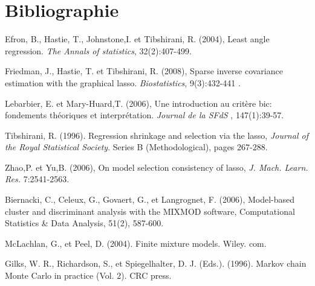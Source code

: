 \documentclass[12pt]{article}
\begin{document}
\section*{Bibliographie}
%

\noindent [1] Efron, B., Hastie, T., Johnstone,I. et Tibshirani, R. (2004), Least angle regression. {\it The
Annals of statistics}, 32(2):407-499.

\noindent [2] Friedman, J., Hastie, T. et Tibshirani, R. (2008), Sparse inverse covariance estimation with
the graphical lasso.  {\it Biostatistics}, 9(3):432-441 .

\noindent [3] Lebarbier, E. et Mary-Huard,T. (2006), Une introduction au critère bic: fondements
théoriques et interprétation.  {\it Journal de la SFdS }, 147(1):39-57.

\noindent[4] Tibshirani, R. (1996). Regression shrinkage and selection via the lasso,  {\it Journal of the Royal
Statistical Society}. Series B (Methodological), pages 267-288.

\noindent [5] Zhao,P. et Yu,B. (2006), On model selection consistency of lasso, {\it J. Mach. Learn.
Res.} 7:2541-2563.

\noindent [6] Biernacki, C., Celeux, G., Govaert, G., et Langrognet, F. (2006), Model-based cluster and discriminant analysis with the MIXMOD software, Computational Statistics \& Data Analysis, 51(2), 587-600.

\noindent [7] McLachlan, G., et Peel, D. (2004). Finite mixture models. Wiley. com.

\noindent [8] Gilks, W. R., Richardson, S., et Spiegelhalter, D. J. (Eds.). (1996). Markov chain Monte Carlo in practice (Vol. 2). CRC press.
%
%
%
\end{document}
